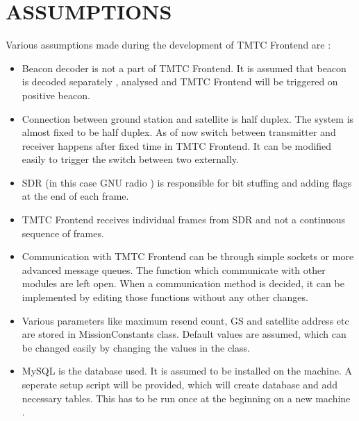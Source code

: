 \documentclass[BTech]{iitmdiss}
\begin{document}
\chapter{ASSUMPTIONS}
Various assumptions made during the development of TMTC Frontend are :
\begin{itemize}
\item Beacon decoder is not a part of TMTC Frontend. It is assumed that beacon is decoded separately , analysed and TMTC Frontend will be triggered on positive beacon.
\item Connection between ground station and satellite is half duplex. The system is almost fixed to be half duplex. As of now switch between transmitter and receiver happens after fixed time in TMTC Frontend. It can be modified easily to trigger the switch between two externally.
\item SDR (in this case GNU radio ) is responsible for bit stuffing and adding flags at the end of each frame.
\item TMTC Frontend receives individual frames from SDR and not a continuous sequence of frames.
\item Communication with TMTC Frontend can be through simple sockets or more advanced message queues. The function which communicate with other modules are left open. When a communication method is decided, it can be implemented by editing those functions without any other changes.
\item Various parameters like maximum resend count, GS and satellite address etc are stored in MissionConstants class. Default values are assumed, which can be changed easily by changing the values in the class.
\item MySQL is the database used. It is assumed to be installed on the machine. A seperate setup script will be provided, which will create database and add necessary tables. This has to be run once at the beginning on a new machine .

\end{itemize}
 


\pagebreak
{}
\end{document}
